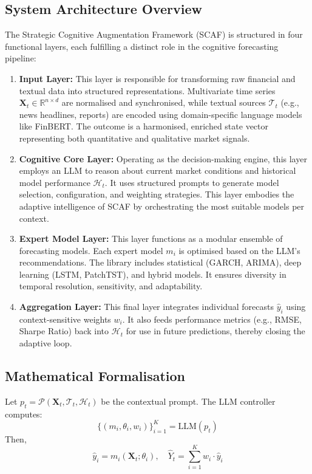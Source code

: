\documentclass[conference]{IEEEtran}
\begin{document}
\subsection{System Architecture Overview}
The Strategic Cognitive Augmentation Framework (SCAF) is structured in four functional layers, each fulfilling a distinct role in the cognitive forecasting pipeline:
\begin{enumerate}
    \item \textbf{Input Layer:} This layer is responsible for transforming raw financial and textual data into structured representations. Multivariate time series $\mathbf{X}_t \in \mathbb{R}^{n \times d}$ are normalised and synchronised, while textual sources $\mathcal{T}_t$ (e.g., news headlines, reports) are encoded using domain-specific language models like FinBERT. The outcome is a harmonised, enriched state vector representing both quantitative and qualitative market signals.

    \item \textbf{Cognitive Core Layer:} Operating as the decision-making engine, this layer employs an LLM to reason about current market conditions and historical model performance $\mathcal{H}_t$. It uses structured prompts to generate model selection, configuration, and weighting strategies. This layer embodies the adaptive intelligence of SCAF by orchestrating the most suitable models per context.

    \item \textbf{Expert Model Layer:} This layer functions as a modular ensemble of forecasting models. Each expert model $m_i$ is optimised based on the LLM's recommendations. The library includes statistical (GARCH, ARIMA), deep learning (LSTM, PatchTST), and hybrid models. It ensures diversity in temporal resolution, sensitivity, and adaptability.

    \item \textbf{Aggregation Layer:} This final layer integrates individual forecasts $\hat{y}_i$ using context-sensitive weights $w_i$. It also feeds performance metrics (e.g., RMSE, Sharpe Ratio) back into $\mathcal{H}_t$ for use in future predictions, thereby closing the adaptive loop.
\end{enumerate}

\subsection{Mathematical Formalisation}
Let $p_t = \mathcal{P}(\mathbf{X}_t, \mathcal{T}_t, \mathcal{H}_t)$ be the contextual prompt. The LLM controller computes:
\[ \{(m_i, \theta_i, w_i)\}_{i=1}^K = \text{LLM}(p_t) \]
Then,
\[ \hat{y}_i = m_i(\mathbf{X}_t; \theta_i), \quad \hat{Y}_t = \sum_{i=1}^K w_i \cdot \hat{y}_i \]
\end{document}
